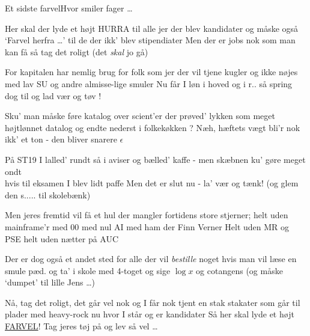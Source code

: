 \begin{sang}{Et sidste farvel}{Hvor smiler fager \ldots}
\begin{vers}
Her skal der lyde et højt {\sc HURRA}
til alle jer der blev kandidater
og måske også `Farvel herfra \ldots '
til de der ikk' blev stipendiater
Men der er jobs nok som man kan få
så tag det roligt (det {\em skal} jo gå)
\end{vers}
\begin{vers}
For kapitalen har nemlig brug
for folk som jer der vil tjene kugler
og ikke nøjes med lav SU
og andre almisse-lige smuler
Nu får I løn i hoved og i r..
så spring dog til og lad vær og tøv !
\end{vers}
\begin{vers}
Sku' man måske føre katalog 
over scient'er der prøved' lykken 
som meget højtlønnet datalog 
og endte nederst i folkekøkken ? 
N{\ae}h, h{\ae}ftets v{\ae}gt bli'r nok ikk' et ton 
- den bliver snarere $\epsilon$ 
\end{vers}
\begin{vers}
På ST19 I lalled' rundt 
så i aviser og b{\ae}lled' kaffe 
- men sk{\ae}bnen ku' gøre meget ondt \\
hvis til eksamen I blev lidt paffe 
Men det er slut nu - la' v{\ae}r og t{\ae}nk! 
(og glem den s..... til skoleb{\ae}nk)
\end{vers}
\begin{vers}
Men jeres fremtid vil få et hul 
der mangler fortidens store stjerner; 
helt uden mainframe'r med 00 
med nul AI med ham der Finn Verner 
Helt uden MR og PSE 
helt uden n{\ae}tter på AUC 
\end{vers}
\begin{vers}
Der er dog også et andet sted 
for alle der vil {\em bestille} noget 
hvis man vil l{\ae}se en smule p{\ae}d. 
og ta' i skole med 4-toget 
og sige $\log x$ og cotangens 
(og måske `dumpet' til lille Jens \ldots) 
\end{vers}
\begin{vers}
Nå, tag det roligt, det går vel nok 
og I får nok tjent en stak stakater 
som går til plader med heavy-rock 
nu hvor I står og er kandidater 
Så her skal lyde et højt \underline{FARVEL}! 
Tag jeres tøj på og lev så vel \ldots
\end{vers}
\laps
\end{sang}